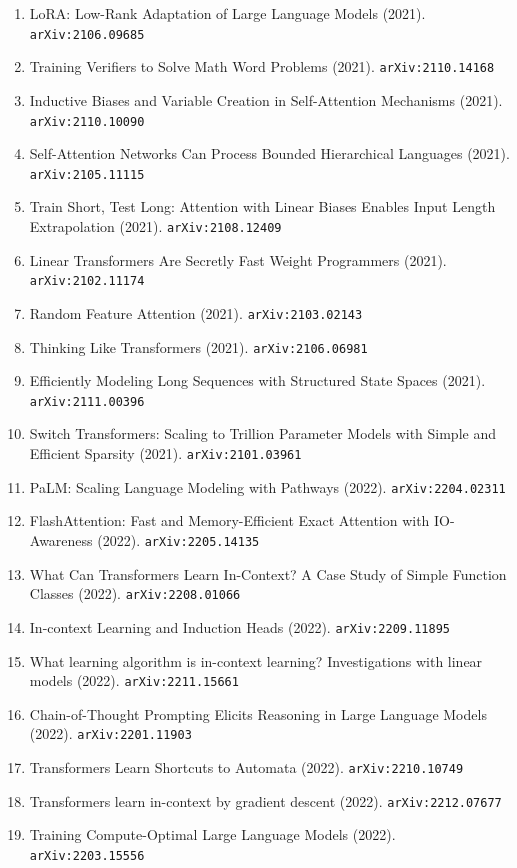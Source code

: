 \documentclass[11pt]{article}
\begin{document}
\begin{enumerate}
  \item LoRA: Low-Rank Adaptation of Large Language Models (2021). \texttt{arXiv:2106.09685}
  \item Training Verifiers to Solve Math Word Problems (2021). \texttt{arXiv:2110.14168}
  \item Inductive Biases and Variable Creation in Self-Attention Mechanisms (2021). \texttt{arXiv:2110.10090}
  \item Self-Attention Networks Can Process Bounded Hierarchical Languages (2021). \texttt{arXiv:2105.11115}
  \item Train Short, Test Long: Attention with Linear Biases Enables Input
  Length Extrapolation (2021). \texttt{arXiv:2108.12409}
  \item Linear Transformers Are Secretly Fast Weight Programmers (2021). \texttt{arXiv:2102.11174}
  \item Random Feature Attention (2021). \texttt{arXiv:2103.02143}
  \item Thinking Like Transformers (2021). \texttt{arXiv:2106.06981}
  \item Efficiently Modeling Long Sequences with Structured State Spaces (2021). \texttt{arXiv:2111.00396}
  \item Switch Transformers: Scaling to Trillion Parameter Models with Simple
  and Efficient Sparsity (2021). \texttt{arXiv:2101.03961}
  \item PaLM: Scaling Language Modeling with Pathways (2022). \texttt{arXiv:2204.02311}
  \item FlashAttention: Fast and Memory-Efficient Exact Attention with
  IO-Awareness (2022). \texttt{arXiv:2205.14135}
  \item What Can Transformers Learn In-Context? A Case Study of Simple Function
  Classes (2022). \texttt{arXiv:2208.01066}
  \item In-context Learning and Induction Heads (2022). \texttt{arXiv:2209.11895}
  \item What learning algorithm is in-context learning? Investigations with
  linear models (2022). \texttt{arXiv:2211.15661}
  \item Chain-of-Thought Prompting Elicits Reasoning in Large Language Models (2022). \texttt{arXiv:2201.11903}
  \item Transformers Learn Shortcuts to Automata (2022). \texttt{arXiv:2210.10749}
  \item Transformers learn in-context by gradient descent (2022). \texttt{arXiv:2212.07677}
  \item Training Compute-Optimal Large Language Models (2022). \texttt{arXiv:2203.15556}

\end{enumerate}
\end{document}
